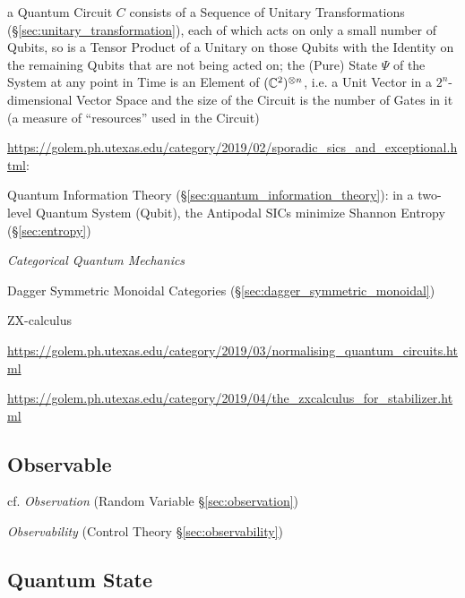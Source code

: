 a Quantum Circuit $C$ consists of a Sequence of Unitary Transformations
(\S\ref{sec:unitary_transformation}), each of which acts on only a small number
of Qubits, so is a Tensor Product of a Unitary on those Qubits with the Identity
on the remaining Qubits that are not being acted on; the (Pure) State $\Psi$ of
the System at any point in Time is an Element of $(\mathbb{C}^2)^{\otimes n}$, i.e.
a Unit Vector in a $2^n$-dimensional Vector Space and the size of the Circuit is
the number of Gates in it (a measure of ``resources'' used in the Circuit)

\asterism

\url{https://golem.ph.utexas.edu/category/2019/02/sporadic_sics_and_exceptional.html}:

Quantum Information Theory (\S\ref{sec:quantum_information_theory}): in a
two-level Quantum System (Qubit), the Antipodal SICs minimize Shannon Entropy
(\S\ref{sec:entropy})

\asterism

\emph{Categorical Quantum Mechanics}

Dagger Symmetric Monoidal Categories (\S\ref{sec:dagger_symmetric_monoidal})

ZX-calculus

\url{https://golem.ph.utexas.edu/category/2019/03/normalising_quantum_circuits.html}

\url{https://golem.ph.utexas.edu/category/2019/04/the_zxcalculus_for_stabilizer.html}



\subsection{Observable}\label{sec:observable}

cf. \emph{Observation} (Random Variable \S\ref{sec:observation})

\emph{Observability} (Control Theory \S\ref{sec:observability})



\subsection{Quantum State}\label{sec:quantum_state}

